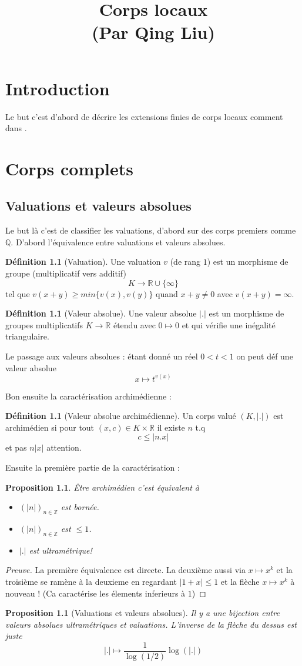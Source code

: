 \documentclass[a4paper,12pt]{book}
\title{Corps locaux \\ \small{(Par Qing Liu)}}
\date{}
\newcommand{\Z}{\mathbb{Z}}
\newcommand{\R}{\mathbb{R}}
\newcommand{\Q}{\mathbb{Q}}
\theoremstyle{plain}
\newtheorem{prop}[subsection]{Proposition}
\theoremstyle{definition}
\newtheorem{defn}[subsection]{Définition}
\theoremstyle{remark}
\begin{document}
\maketitle
\chapter*{Introduction}
Le but c'est d'abord de décrire les extensions finies de corps locaux
comment dans \cite{cassels}.
\chapter{Corps complets}
\section{Valuations et valeurs absolues}
Le but là c'est de classifier les valuations, d'abord sur des corps
premiers comme $\Q$. D'abord l'équivalence entre valuations et 
valeurs absolues. 
\begin{defn}[Valuation]
    Une valuation $v$ (de rang $1$) est un morphisme de groupe 
    (multiplicatif vers additif) \[K\to \R\cup\{\infty\}\]
    tel que $v(x+y)\geq min\{v(x), v(y)\}$ quand $x+y\ne 0$ avec
    $v(x+y)=\infty$.
\end{defn}
\begin{defn}[Valeur absolue]
    Une valeur absolue $|.|$ est un morphisme de groupes multiplicatifs
    $K\to \R$ étendu avec $0\mapsto 0$ et qui vérifie une inégalité 
    triangulaire.
\end{defn}
Le passage aux valeurs absolues : étant donné un réel $0<t<1$ on peut
déf une valeur absolue 
\[x\mapsto t^{v(x)}\]

Bon ensuite la caractérisation archimédienne :
\begin{defn}[Valeur absolue archimédienne]
    Un corps valué $(K,|.|)$ est archimédien si pour tout 
    $(x,c)\in K\times \R$ il existe $n$ t.q \[c\leq |n.x|\]
    et pas $n|x|$ attention.
\end{defn}
Ensuite la première partie de la caractérisation :
\begin{prop}
    Être archimédien c'est équivalent à 
    \begin{itemize}
        \item $(|n|)_{n\in \Z}$  est bornée.
        \item $(|n|)_{n\in \Z}$  est $\leq 1$.
        \item $|.|$ est ultramétrique!
    \end{itemize}
\end{prop}
\begin{proof}[Preuve]
    La première équivalence est directe. La deuxième aussi via 
    $x\mapsto x^k$ et la troisième se ramène à la deuxieme en 
    regardant $|1+x|\leq 1$ et la flèche $x\mapsto x^k$ à nouveau !
    (Ca caractérise les élements inferieurs à $1$)
\end{proof}
\begin{prop}[Valuations et valeurs absolues]
    Il y a une bijection entre valeurs absolues ultramétriques
    et valuations. L'inverse de la flèche du dessus est juste 
    \[|.|\mapsto \frac{1}{\log(1/2)}\log(|.|)\]
\end{prop}
\end{document}
